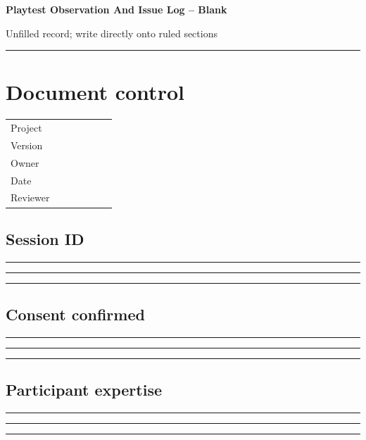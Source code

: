 \documentclass[11pt]{article}
\begin{document}
{\huge\bfseries\color{suiteblue} Playtest Observation And Issue Log -- Blank}\par
\vspace{0.15in}
{\normalsize\color{suitegray} Unfilled record; write directly onto ruled sections}\par
\vspace{0.15in}\hrule\vspace{0.15in}

\section{Document control}
\renewcommand{\arraystretch}{1.8}
\begin{tabularx}{\linewidth}{@{}p{0.30\linewidth}X@{}}\toprule
Project & \hrulefill\\ Version & \hrulefill\\ Owner & \hrulefill\\ Date & \hrulefill\\ Reviewer & \hrulefill\\ \bottomrule\end{tabularx}

\subsection{Session ID}
\noindent\rule{\linewidth}{0.3pt}\par\vspace{0.18in}
\noindent\rule{\linewidth}{0.3pt}\par\vspace{0.18in}
\noindent\rule{\linewidth}{0.3pt}\par\vspace{0.14in}

\subsection{Consent confirmed}
\noindent\rule{\linewidth}{0.3pt}\par\vspace{0.18in}
\noindent\rule{\linewidth}{0.3pt}\par\vspace{0.18in}
\noindent\rule{\linewidth}{0.3pt}\par\vspace{0.14in}

\subsection{Participant expertise}
\noindent\rule{\linewidth}{0.3pt}\par\vspace{0.18in}
\noindent\rule{\linewidth}{0.3pt}\par\vspace{0.18in}
\noindent\rule{\linewidth}{0.3pt}\par\vspace{0.14in}
\end{document}
